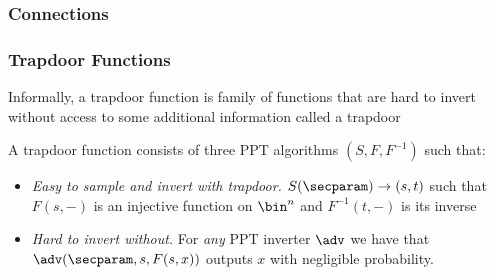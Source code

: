 \documentclass{beamer}
\begin{document}
\begin{frame}
    \frametitle{Connections}
    \begin{center}
    \end{center}
\end{frame}



\begin{frame}
    \frametitle{Trapdoor Functions}
    Informally, a trapdoor function is family of functions that are
    hard to invert without access to some additional information called a trapdoor
    \begin{definition}
        A trapdoor function consists of three PPT algorithms $(S, F, F^{-1})$
        such that:
        \begin{itemize}
            \item \textit{Easy to sample and invert with trapdoor.} $S(\secparam) \rightarrow (s, t)$
                  such that $F(s, {-})$ is an injective function on $\bin^n$ and $F^{-1}(t, {-})$ is its inverse
            \item \textit{Hard to invert without.} For \textit{any} PPT inverter $\adv$ we have that $\adv(\secparam, s, F(s, x))$
                  outputs $x$ with negligible probability.
        \end{itemize}
    \end{definition}
\end{frame}
\end{document}
